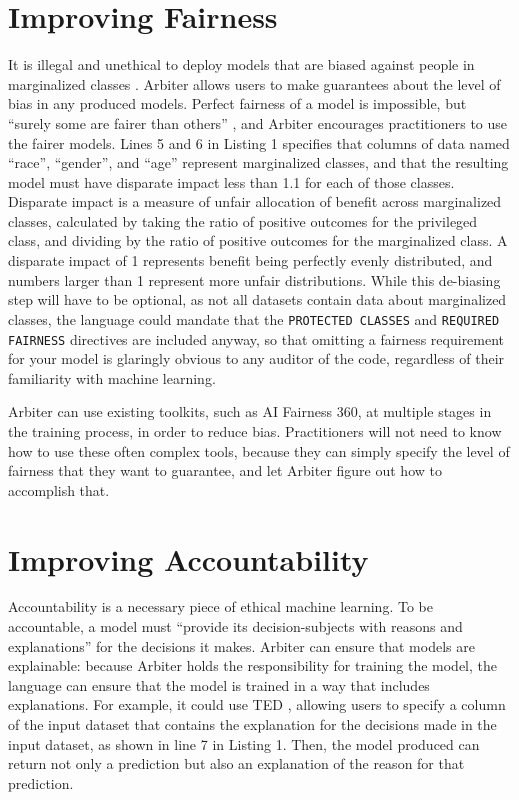 \documentclass[letterpaper]{article}
\newcommand{\citep}[1]{\cite{#1}}
\begin{document}
\section{Improving Fairness}
It is illegal and unethical to deploy models that are biased against people in marginalized classes \citep{Barocas2016}. Arbiter allows users to make guarantees about the level of bias in any produced models. Perfect fairness of a model is impossible, but ``surely some are fairer than others'' \citep{Grant2019}, and Arbiter encourages practitioners to use the fairer models. Lines 5 and 6 in Listing 1 specifies that columns of data named ``race'', ``gender'', and ``age'' represent marginalized classes, and that the resulting model must have disparate impact less than 1.1 for each of those classes. Disparate impact is a measure of unfair allocation of benefit across marginalized classes, calculated by taking the ratio of positive outcomes for the privileged class, and dividing by the ratio of positive outcomes for the marginalized class. A disparate impact of 1 represents benefit being perfectly evenly distributed, and numbers larger than 1 represent more unfair distributions. While this de-biasing step will have to be optional, as not all datasets contain data about marginalized classes, the language could mandate that the \texttt{PROTECTED CLASSES} and \texttt{REQUIRED FAIRNESS} directives are included anyway, so that omitting a fairness requirement for your model is glaringly obvious to any auditor of the code, regardless of their familiarity with machine learning.

Arbiter can use existing toolkits, such as AI Fairness 360, at multiple stages in the training process, in order to reduce bias. Practitioners will not need to know how to use these often complex tools, because they can simply specify the level of fairness that they want to guarantee, and let Arbiter figure out how to accomplish that.

\section{Improving Accountability}
Accountability is a necessary piece of ethical machine learning. To be accountable, a model must ``provide its decision-subjects with reasons and explanations'' \citep{Binns2017} for the decisions it makes. Arbiter can ensure that models are explainable: because Arbiter holds the responsibility for training the model, the language can ensure that the model is trained in a way that includes explanations. For example, it could use TED \citep{Hind2019}, allowing users to specify a column of the input dataset that contains the explanation for the decisions made in the input dataset, as shown in line 7 in Listing 1. Then, the model produced can return not only a prediction but also an explanation of the reason for that prediction.
\end{document}
